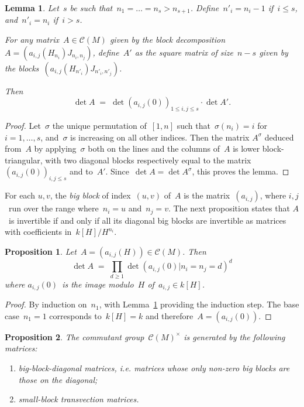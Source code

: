 \documentclass{article}%
\newtheorem{prop}{Proposition}
\newtheorem{lem}{Lemma}
\let\ro\mathscr
\begin{document}
\begin{lem}\label{lem:det-1block}
Let~$s$ be such that~$n_1 = … = n_s > n_{s+1}$.
Define~$n'_i = n_i - 1$ if~$i ≤ s$, and~$n'_i = n_i$ if~$i > s$.

For any matrix~$A ∈ \ro C(M)$ given by the block decomposition~$A =
(a_{i,j}(H_{n_i}) J_{n_i,n_j})$, define~$A'$ as the square matrix of
size~$n - s$ given by the blocks~$(a_{i,j}(H_{n'_i}) J_{n'_i,
n'_j})$.

Then \[ \det A \;=\; \det (a_{i,j}(0))_{1 ≤ i,j ≤ s} · \det A'. \]
\end{lem}


\begin{proof}
Let~$σ$ the unique permutation of~$[1,n]$ such that~$σ(n_i) = i$ for~$i =
1, …, s$, and~$σ$ is increasing on all other indices. Then the matrix
$A^{σ}$ deduced from~$A$ by applying~$σ$ both on the lines and the
columns of~$A$ is lower block-triangular, with two diagonal blocks
respectively equal to the matrix~$(a_{i,j}(0))_{i,j ≤ s}$ and to~$A'$.
Since~$\det A = \det A^{σ}$, this proves the lemma.
\end{proof}

For each $u, v$, the \emph{big block} of index~$(u, v)$ of~$A$ is the
matrix~$(a_{i,j})$, where $i,j$~run over the range where~$n_i = u$
and~$n_j = v$. The next proposition states that $A$~is invertible if and
only if all its diagonal big blocks are invertible as matrices with
coefficients in~$k[H]/H^{n_i}$.

\begin{prop}\label{prop:det-bigblock}
Let~$A = (a_{i,j}(H)) ∈ \ro C(M)$. Then
\[ \det A \;=\; ∏_{d ≥ 1} \det (a_{i,j}(0) | n_{i} = n_j = d)^{d} \]
where $a_{i,j}(0)$~is the image modulo~$H$ of~$a_{i,j} ∈ k[H]$.
\end{prop}

\begin{proof}
By induction on~$n_1$, with Lemma~\ref{lem:det-1block} providing the
induction step. The base case~$n_1 = 1$ corresponds to~$k[H] = k$ and
therefore~$A = (a_{i,j}(0))$.
\end{proof}

\begin{prop}\label{prop:structure-gl}
The commutant group~$\ro C(M)^{×}$ is
generated by the following matrices:
\begin{enumerate}
\item big-block-diagonal matrices, i.e. matrices whose only non-zero big
blocks are those on the diagonal;
\item small-block transvection matrices.
\end{enumerate}
\end{prop}
\end{document}
